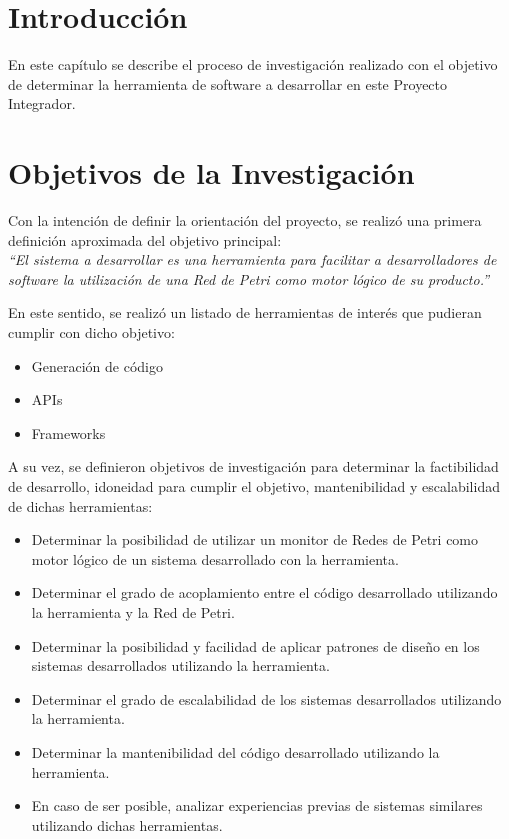 \section{Introducción}
En este capítulo se describe el proceso de investigación realizado con el
objetivo de determinar la herramienta de software a desarrollar en este
Proyecto Integrador.

\section{Objetivos de la Investigación}
Con la intención de definir la orientación del proyecto, se realizó
una primera definición aproximada del objetivo principal:\\
\emph{``El sistema a desarrollar es una herramienta para facilitar a
desarrolladores de software la utilización de una Red de Petri como motor lógico de su
producto.''}

En este sentido, se realizó un listado de herramientas de interés que pudieran
cumplir con dicho objetivo:
\begin{itemize}
  \item Generación de código
  \item APIs
  \item Frameworks
\end{itemize}

A su vez, se definieron objetivos de investigación para determinar la
factibilidad de desarrollo, idoneidad para cumplir el objetivo, mantenibilidad
y escalabilidad de dichas herramientas:
\begin{itemize}
    \item Determinar la posibilidad de utilizar un monitor de Redes de Petri
    como motor lógico de un sistema desarrollado con la herramienta.
    \item Determinar el grado de acoplamiento  entre el código desarrollado
    utilizando la herramienta y la Red de Petri.
    \item Determinar la posibilidad y facilidad de aplicar patrones de
    diseño en los sistemas desarrollados utilizando la herramienta.
    \item Determinar el grado de escalabilidad de los sistemas desarrollados
    utilizando la herramienta.
    \item Determinar la mantenibilidad del código desarrollado
    utilizando la herramienta.
    \item En caso de ser posible, analizar experiencias previas de sistemas
    similares utilizando dichas herramientas.
\end{itemize}

